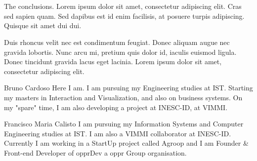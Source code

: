 \documentclass[a4paper,12pt,journal,twoside,compsoc]{PPIEEEtran}
\begin{document}
\section{}
The conclusions. Lorem ipsum dolor sit amet, consectetur adipiscing elit. Cras sed sapien quam. Sed dapibus est id enim facilisis, at posuere turpis adipiscing. Quisque sit amet dui dui.

Duis rhoncus velit nec est condimentum feugiat. Donec aliquam augue nec gravida lobortis. Nunc arcu mi, pretium quis dolor id, iaculis euismod ligula. Donec tincidunt gravida lacus eget lacinia. Lorem ipsum dolor sit amet, consectetur adipiscing elit.

%

% 
\begin{IEEEbiography}{Bruno Cardoso}
Here I am. I am pursuing my Engineering studies at \ac{IST}. Starting my masters in Interaction and Visualization, and also on business systems. On my "spare" time, I am also developing a project at INESC-ID, at VIMMI.
\end{IEEEbiography}
\begin{IEEEbiography}
{Francisco Maria Calisto}
I am pursuing my Information Systems and Computer  Engineering studies at \ac{IST}. I am also a VIMMI collaborator at INESC-ID. Currently I am working in a StartUp project called Agroop and I am Founder \& Front-end Developer of opprDev a oppr Group organisation.
\end{IEEEbiography}
\end{document}

